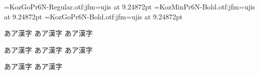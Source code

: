 \documentclass{ltjsarticle}
\begin{document}
\jfont\jaA=KozGoPr6N-Regular.otf:jfm=ujis at 9.24872pt
\jfont\jaB=KozMinPr6N-Bold.otf:jfm=ujis   at 9.24872pt
\jfont\jaC=KozGoPr6N-Bold.otf:jfm=ujis    at 9.24872pt

\jaA 
あア漢字%
\ltjsetaltfont\jaA{}
あア漢字%
\ltjsetaltfont\jaA{}
あア漢字%

\ltjsetaltfont\jaA{}
\ltjsetaltfont\jaA{}
あア漢字%
\mc
あア漢字%
\jaA 
あア漢字%

\jaA 
あア漢字%
\ltjclearaltfont\jaA
あア漢字%
\end{document}
